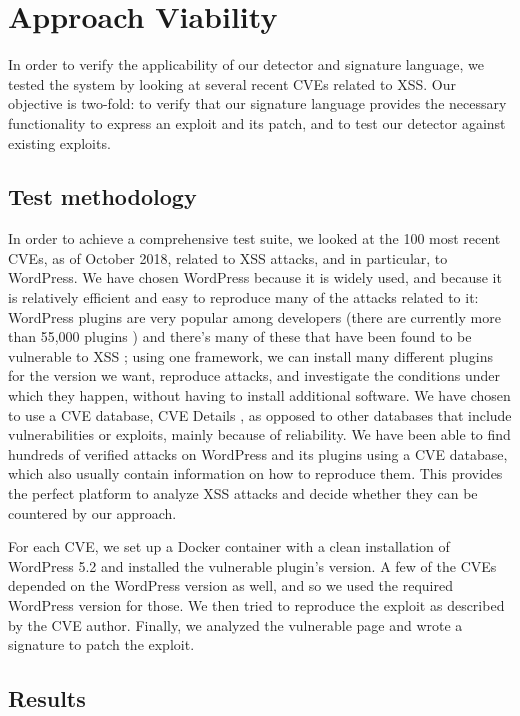 \section{Approach Viability}

In order to verify the applicability of our detector and signature language, we tested the system by looking at several recent CVEs related to XSS. Our objective is two-fold: to verify that our signature language provides the necessary functionality to express an exploit and its patch, and to test our detector against existing exploits.

\subsection{Test methodology}
In order to achieve a comprehensive test suite, we looked at the 100 most recent CVEs, as of October 2018, related to XSS attacks, and in particular, to WordPress. We have chosen WordPress because it is widely used, and because it is relatively efficient and easy to reproduce many of the attacks related to it: WordPress plugins are very popular among developers (there are currently more than 55,000 plugins \cite{wpplugins}) and there's many of these that have been found to be vulnerable to XSS \cite{wpscan}; using one framework, we can install many different plugins for the version we want, reproduce attacks, and investigate the conditions under which they happen, without having to install additional software. We have chosen to use a CVE database, CVE Details \cite{cvedetails}, as opposed to other databases that include vulnerabilities or exploits, mainly because of reliability. We have been able to find hundreds of verified attacks on WordPress and its plugins using a CVE database, which also usually contain information on how to reproduce them. This provides the perfect platform to analyze XSS attacks and decide whether they can be countered by our approach. 

For each CVE, we set up a Docker container with a clean installation of WordPress 5.2 and installed the vulnerable plugin's version. A few of the CVEs depended on the WordPress version as well, and so we used the required WordPress version for those. We then tried to reproduce the exploit as described by the CVE author. Finally, we analyzed the vulnerable page and wrote a signature to patch the exploit.

\subsection{Results}

